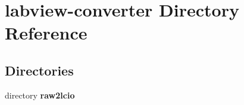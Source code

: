 \section{labview-\/converter Directory Reference}
\label{dir_065690522287898e37075a6d4f34d29a}
\subsection*{Directories}
\begin{DoxyCompactItemize}
\item 
directory {\bf raw2lcio}
\end{DoxyCompactItemize}
